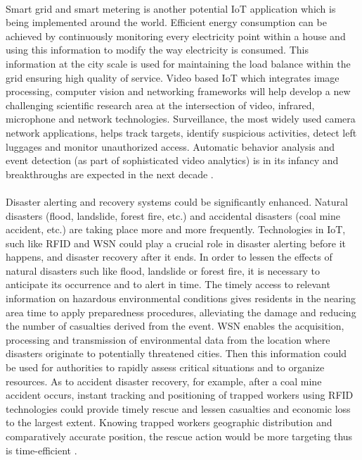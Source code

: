 \documentclass[10pt, twocolumn]{article}
\begin{document}
\paragraph{}
Smart grid and smart metering is another potential IoT application which is being implemented around the world. Efficient energy consumption can be achieved by continuously monitoring every electricity point within a house and using this information to modify the way electricity is consumed. This information at the city scale is used for maintaining the load balance within the grid ensuring high quality of service.
Video based IoT which integrates image processing, computer vision and networking frameworks will help develop a new challenging scientific research area at the intersection of video, infrared, microphone and network technologies. Surveillance, the most widely used camera network applications, helps track targets, identify suspicious activities, detect left luggages and monitor unauthorized access. Automatic behavior analysis and event detection (as part of sophisticated video analytics) is in its infancy and breakthroughs are expected in the next decade \cite{ref1}.
\paragraph{}
Disaster alerting and recovery systems could be significantly enhanced. Natural disasters (flood, landslide, forest fire, etc.) and accidental disasters (coal mine accident, etc.) are taking place more and more frequently. Technologies in IoT, such like RFID and WSN could play a crucial role in disaster alerting before it happens, and disaster recovery after it ends. In order to lessen the effects of natural disasters such like flood, landslide or forest fire, it is necessary to anticipate its occurrence and to alert in time. The timely access to relevant information on hazardous environmental conditions gives residents in the nearing area time to apply preparedness procedures, alleviating the damage and reducing the number of casualties derived from the event. WSN enables the acquisition, processing and transmission of environmental data from the location where disasters originate to potentially threatened cities. Then this information could be used for authorities to rapidly assess critical situations and to organize resources. As to accident disaster recovery, for example, after a coal mine accident occurs, instant tracking and positioning of trapped workers using RFID technologies could provide timely rescue and lessen casualties and economic loss to the largest extent. Knowing trapped workers geographic distribution and comparatively accurate position, the rescue action would be more targeting thus is time-efficient \cite{ref7}.
\end{document}

